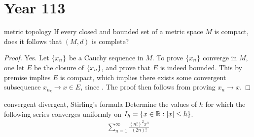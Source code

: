 \documentclass{report}
\begin{document}
\section{Year 113}
\begin{question}{metric topology}{}
If every closed and bounded set of a metric space $M$ is compact, does it follows that $(M,d)$ is complete?  
\end{question}
\begin{proof}
  Yes. Let $\left\{ x_n \right\}$ be a Cauchy sequence in $M$. To prove $\left\{ x_n \right\}$ converge in $M$, one let  $E$ be the closure of  $\left\{ x_n \right\}$, and prove that $E$ is indeed bounded. This by premise implies $E$ is compact, which implies there exists some convergent subsequence  $x_{n_k}\rightarrow x \in E$, since . The proof then follows from proving $x_n \rightarrow x$. 
\end{proof}
\begin{question}{convergent divergent, Stirling's formula}{}
Determine the values of $h$ for which the following series converges uniformly on  $I_h=\left\{ x\in\mathbb{R}:\left|x\right|\leq h \right\}$.
\begin{align}
\label{tgq}
\sum_{n=1}^{\infty} \frac{(n!)^2x^n}{(2n)!}
\end{align}
\end{question}
\end{document}

